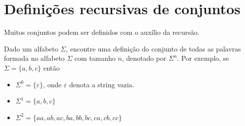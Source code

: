 



    


    
    


\section{Definições recursivas de conjuntos}

Muitos conjuntos podem ser definidos com o auxílio da recursão. 

\begin{exemplo}
Dado um alfabeto $\Sigma$, encontre uma definição do conjunto de todas as palavras formada no alfabeto $\Sigma$ com tamanho $n$, denotado por $\Sigma^n$. Por exemplo, se $\Sigma = \{a,b,c\}$ então

\begin{itemize}
    \item $\Sigma^0 = \{ \varepsilon \}$, onde $\varepsilon$ denota a string vazia.
    \item $\Sigma^1 = \{ a,b,c \}$
    
    \item $\Sigma^2 = \{ aa,ab,ac, ba,bb,bc, ca,cb,cc \}$
    
\end{itemize}

\end{exemplo}
 
